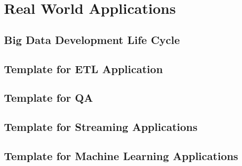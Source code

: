 \section{Real World Applications}
\subsection{Big Data Development Life Cycle}
\subsection{Template for ETL Application}
\subsection{Template for QA}
\subsection{Template for Streaming Applications}
\subsection{Template for Machine Learning Applications}
